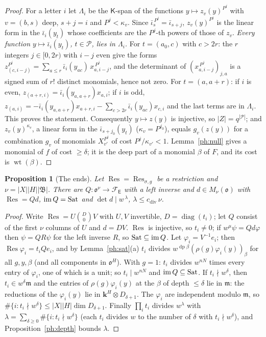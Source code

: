 \documentclass[10pt]{amsart}
\newtheorem{proposition}[theorem]{Proposition}
\theoremstyle{definition}
\theoremstyle{remark}
\providecommand{\pam}{\mathfrak m}
\providecommand{\pao}{\mathfrak o}
\providecommand{\phB}{\mathfrak B}
\providecommand{\phcd}{c_{\mathrm{div}}}
\providecommand{\phdep}{\operatorname{dp}}
\providecommand{\phk}{\boldsymbol k}
\begin{document}
\begin{proof}
For a letter $i$ let $\Lambda_i$ be the $\mathsf K$-span of the functions $y\mapsto z_v(y)^{P^j}$
with $v=(b,s)$ deep, $s+j=i$ and $P^j<\kappa_v$. Since $\bar\iota_s^{\,P^j}=\bar\iota_{s+j}$,
$z_v(y)^{P^j}$ is the linear form in the $\bar\iota_i(y_t)$ whose coefficients are the $P^j$-th
powers of those of $z_v$. \emph{Every function $y\mapsto\bar\iota_i(y_t)$, $t\in\mathcal P$, lies
in $\Lambda_i$.} For $t=(a_0,c)$ with $c>2r$: the $r$ integers $j\in[0,2r)$ with $i-j$ even give
the forms $z_{(c,i-j)}^{P^j}=\sum_{a\le r}\bar\iota_i(y_{ac})\,x_{a,i-j}^{\,P^j}$, and the
determinant of $(x_{a,i-j}^{\,P^j})_{j,a}$ is a signed sum of $r!$ distinct monomials, hence not
zero. For $t=(a,a+r)$: if $i$ is even, $z_{(a+r,i)}=\bar\iota_i(y_{a,a+r})x_{a,i}$; if $i$ is odd,
$z_{(a,i)}=-\bar\iota_i(y_{a,a+r})x_{a+r,i}-\sum_{c>2r}\bar\iota_i(y_{ac})x_{c,i}$ and the last
terms are in $\Lambda_i$. This proves the statement. Consequently $y\mapsto z(y)$ is injective, so
$|Z|=q^{|\mathcal P|}$; and $z_v(y)^{\kappa_v}$, a linear form in the $\bar\iota_{s+j_0}(y_t)$
($\kappa_v=P^{j_0}$), equals $g_v(z(y))$ for a combination $g_v$ of monomials $X_{v'}^{P^j}$ of cost
$P^j/\kappa_{v'}<1$. Lemma~\ref{ph:null} gives a monomial of $f$ of cost $\ge\delta$; it is the
deep part of a monomial $\beta$ of $F$, and its cost is $\operatorname{wt}(\beta)$.
\end{proof}

\begin{proposition}[The ends]\label{ph:ends}
Let $\operatorname{Res}=\operatorname{Res}_{\sigma,g}$ be a restriction and $\nu=|X||H||\phB|$.
There are $Q\colon\pao^\nu\to\mathcal F_{\mathsf E}$ with a left inverse and $d\in M_\nu(\pao)$
with $\operatorname{Res}=Qd$, $\operatorname{im} Q=\operatorname{Sat}$ and $\det d\mid w^{\,\lambda}$,
$\lambda\le\phcd\,\nu$.
\end{proposition}
\begin{proof}
Write $\operatorname{Res}=U\binom D0V$ with $U,V$ invertible, $D=\operatorname{diag}(t_i)$; let $Q$
consist of the first $\nu$ columns of $U$ and $d=DV$. $\operatorname{Res}$ is injective, so
$t_i\ne0$; if $w^\mu\psi=Qd\varphi$ then $\psi=QR\psi$ for the left inverse $R$, so
$\operatorname{Sat}\subseteq\operatorname{im} Q$. Let $\varphi_i=V^{-1}e_i$; then $\operatorname{Res}\varphi_i=
t_iQe_i$, and by Lemma~\ref{ph:sat}(a) $t_i$ divides $w^{\phdep\beta}(\rho(g)\varphi_i(y))_\beta$
for all $g,y,\beta$ (and all components in $\pao^H$). With $g=1$: $t_i$ divides $w^{nN}$ times
every entry of $\varphi_i$, one of which is a unit; so $t_i\mid w^{nN}$ and $\operatorname{im}
Q\subseteq\operatorname{Sat}$. If $t_i\nmid w^\delta$, then $t_i\in w^\delta\pam$ and the entries
of $\rho(g)\varphi_i(y)$ at the $\beta$ of depth $\le\delta$ lie in $\pam$: the reductions of the
$\varphi_i(y)$ lie in $\phk^H\otimes D_{\delta+1}$. The $\varphi_i$ are independent modulo $\pam$,
so $\#\{i:t_i\nmid w^\delta\}\le|X||H|\dim D_{\delta+1}$. Finally $\prod_it_i$ divides
$w^\lambda$ with $\lambda=\sum_{\delta\ge0}\#\{i:t_i\nmid w^\delta\}$ (each $t_i$ divides $w$ to
the number of $\delta$ with $t_i\nmid w^\delta$), and Proposition~\ref{ph:depth} bounds $\lambda$.
\end{proof}
\end{document}
